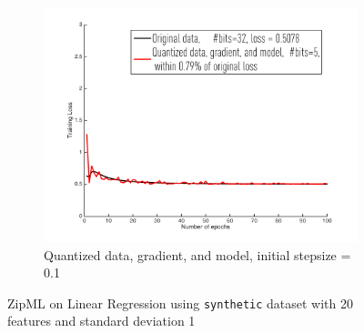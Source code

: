\documentclass{article}
\begin{document}
\begin{figure}[h]
\begin{subfigure}[h]{.3\columnwidth}
    \includegraphics[width=\columnwidth]{lr/synthetic/20easy/dgm01}
     \caption{Quantized data, gradient, and model, initial stepsize = 0.1}
    \end{subfigure}
    
\caption{ZipML on Linear Regression using \texttt{synthetic} dataset with 20 features and standard deviation 1}
\label{fig:lr20easy}
\end{figure}
\end{document}
